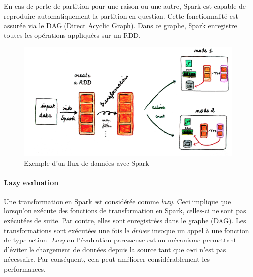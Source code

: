 En cas de perte de partition pour une raison ou une autre, Spark est capable de reproduire automatiquement la partition en question. Cette fonctionnalité est assurée via le DAG (Direct Acyclic Graph). Dans ce graphe, Spark enregistre toutes les opérations appliquées sur un RDD.

\begin{figure}[h]
	\centering
	\captionsetup{justification= centering}
	\includegraphics[width=0.7\linewidth]{illustrations/global_view_rdd}
	\caption{Exemple d'un flux de données avec Spark}
	\label{fig:globalviewrdd}
\end{figure}



\paragraph{Lazy evaluation} \label{lazy-evaluation}
Une transformation en Spark est considérée comme \textit{lazy}. Ceci implique que lorsqu'on exécute des fonctions de transformation en Spark, celles-ci ne sont pas exécutées de suite. Par contre, elles sont enregistrées dans le graphe (DAG).  Les transformations sont exécutées une fois le \textit{driver} invoque un appel à une fonction de type action. \textit{Lazy} ou l'évaluation paresseuse est un mécanisme permettant d'éviter le chargement de données depuis la source tant que ceci n'est pas nécessaire. Par conséquent, cela peut améliorer considérablement les performances.


